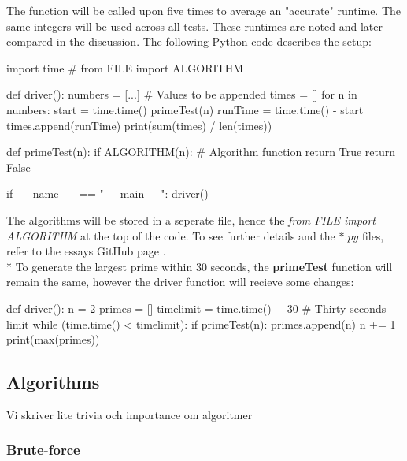 \documentclass[main.tex]{subfiles}
\begin{document}
\vspace{10mm}

The function will be called upon five times to average an "accurate" runtime. The same integers will be used across all tests. These runtimes are noted and later compared in the discussion. The following Python code describes the setup:

\begin{python}
    import time
    # from FILE import ALGORITHM

    def driver():
        numbers = [...] # Values to be appended
        times = []
        for n in numbers:
            start = time.time()
            primeTest(n)
            runTime = time.time() - start
            times.append(runTime)
        print(sum(times) / len(times))

    def primeTest(n):
        if ALGORITHM(n): # Algorithm function
            return True
        return False

    if __name__ == "__main__":
        driver()
\end{python}

The algorithms will be stored in a seperate file, hence the \textit{from FILE import ALGORITHM} at the top of the code. To see further details and the $*.py$ files, refer to the essays GitHub page \cite{github}.
\newline
\\*
To generate the largest prime within $30$ seconds, the \textbf{primeTest} function will remain the same, however the driver function will recieve some changes:

\begin{python}
    def driver():
        n = 2
        primes = []
        timelimit = time.time() + 30  # Thirty seconds limit
        while (time.time() < timelimit):
            if primeTest(n):
                primes.append(n)
            n += 1
        print(max(primes))
\end{python}



\subsection{Algorithms}

Vi skriver lite trivia och importance om algoritmer

\subsubsection{Brute-force}
\end{document}
